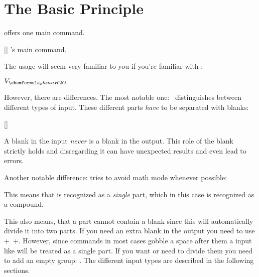 \documentclass[load-preamble+]{cnltx-doc}
\begin{document}
\section{The Basic Principle}
\chemformula{} offers one main command.
\begin{commands}
  []
    \chemformula's main command.
\end{commands}
The usage will seem very familiar to you if you're familiar with :
\begin{example}
   \par
   \par
   \par
   \par
   \par
  \ch{[AgCl2]-} \par
   \par
   \par
   \par
   \par
   \par
   \par
  $V_{\ch{H2O}}$ \par
   \par
\end{example}

However, there are differences.  The most notable one: \chemformula\
distinguishes between different types of input.  These different parts
\emph{have} to be separated with blanks:
\begin{commands}
  []
\end{commands}
A blank in the input \emph{never} is a blank in the output.  This role of the
blank strictly holds and disregarding it can have unexpected results and even
lead to errors.

Another notable difference: \chemformula{} tries to avoid math mode whenever
possible:
\begin{example}
   \par
\end{example}

This means that  is recognized as a \emph{single} part,
which in this case is recognized as a compound.
\begin{example}
   \par
  \ch{2 H2O}
\end{example}
This also means, that a part cannot contain a blank since this will
automatically divide it into two parts.  If you need an extra blank in the
output you need to use \verbcode+~+.  However, since commands in most cases
gobble a space after them a input like \Marg{\cs*{command} ABC} will be
treated as a single part.  If you want or need to divide them you need to add
an empty group: \cs{ch}\Marg{\cs*{command}\marg{} ABC}.  The different input
types are described in the following sections.
\end{document}
